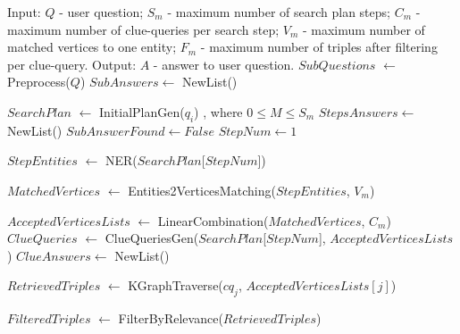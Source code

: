 \begin{algorithm}[H]
\begin{algorithmic}[1]
    \State  \textsf{Input}: $Q$ - user question; $S_m$ - maximum number of search plan steps; $C_m$ - maximum number of clue-queries per search step; $V_m$ - maximum number of matched vertices to one entity; $F_m$ - maximum number of triples after filtering per clue-query. 
    \State  \textsf{Output}: $A$ - answer to user question.
    \State $SubQuestions$ $\leftarrow$ Preprocess($Q$)  %
    \State $SubAnswers \leftarrow$  NewList()
    
        \State $SearchPlan$ $\leftarrow$ InitialPlanGen($q_i$) \Comment{$[s_1, s_2, ..., s_M]$}, where $0 \leq M \leq S_m$  
        \State $StepsAnswers \leftarrow$  NewList()
        \State $SubAnswerFound \leftarrow False$
        \State $StepNum \leftarrow 1$
        
            \State $StepEntities$ $\leftarrow$ NER($SearchPlan$[$StepNum$]) \Comment{$[e_1, e_2, ..., e_U]$}
        
            \State $MatchedVertices$ $\leftarrow$ Entities2VerticesMatching($StepEntities$, $V_m$) 
            
            \State $AcceptedVerticesLists$ $\leftarrow$ LinearCombination($MatchedVertices$, $C_m$) 
            \State $ClueQueries$ $\leftarrow$ ClueQueriesGen($SearchPlan$[$StepNum$], $AcceptedVerticesLists$) \Comment{$[cq_1, cq_2, ..., cq_{C_m}]$}
            \State $ClueAnswers \leftarrow$ NewList()
            
                \State $RetrievedTriples$ $\leftarrow$ KGraphTraverse($cq_j$, $AcceptedVerticesLists[j]$)  
                
                \State $FilteredTriples$ $\leftarrow$ FilterByRelevance($RetrievedTriples$)  


\end{algorithmic}
\end{algorithm}
